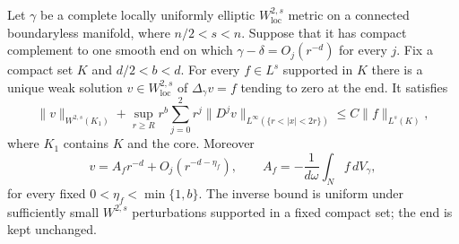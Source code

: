 \begin{lemma}
\label{lem:static:compact-source}
Let $\gamma$ be a complete locally uniformly elliptic
$W^{2,s}_{\mathrm{loc}}$ metric on a connected boundaryless manifold,
where $n/2<s<n$.  Suppose that it has compact complement to one
smooth end on which $\gamma-\delta=O_j(r^{-d})$ for every $j$.
Fix a compact set $K$ and $d/2<b<d$.  For every $f\in L^s$ supported
in $K$ there is a unique weak solution $v\in W^{2,s}_{\mathrm{loc}}$
of $\Delta_\gamma v=f$ tending to zero at the end.  It satisfies
\begin{equation}
 \|v\|_{W^{2,s}(K_1)}+
 \sup_{r\ge R}r^b\sum_{j=0}^2r^j
          \|D^jv\|_{L^\infty(\{r<|x|<2r\})}
       \le C\|f\|_{L^s(K)},
 \label{eq:static:inverse-estimate}
\end{equation}
where $K_1$ contains $K$ and the core.  Moreover
\begin{equation}
 v=A_f r^{-d}+O_j(r^{-d-\eta_f}),\qquad
 A_f=-\frac{1}{d\omega}\int_N f\,dV_\gamma,
 \label{eq:static:source-flux}
\end{equation}
for every fixed $0<\eta_f<\min\{1,b\}$.  The inverse bound is uniform
under sufficiently small $W^{2,s}$ perturbations supported in a fixed
compact set; the end is kept unchanged.
\end{lemma}


